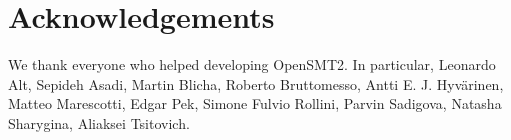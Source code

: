 \documentclass{easychair}
\begin{document}
\section{Acknowledgements}
We thank everyone who helped
developing OpenSMT2. In particular,
Leonardo Alt,
Sepideh Asadi,
Martin Blicha,
Roberto Bruttomesso,
Antti E. J. Hyv{\"a}rinen,
Matteo Marescotti,
Edgar Pek,
Simone Fulvio Rollini,
Parvin Sadigova,
Natasha Sharygina,
Aliaksei Tsitovich.
\fi



\end{document}

